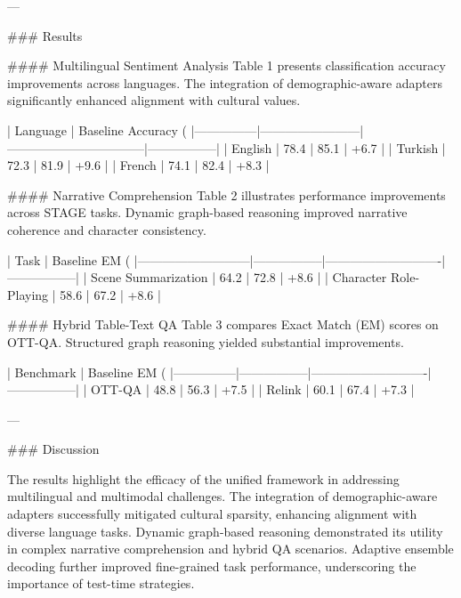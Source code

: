 ---

### Results

#### Multilingual Sentiment Analysis
Table 1 presents classification accuracy improvements across languages. The integration of demographic-aware adapters significantly enhanced alignment with cultural values.

| Language      | Baseline Accuracy (%
|---------------|------------------------|---------------------------------|-----------------|
| English       | 78.4                  | 85.1                           | +6.7            |
| Turkish       | 72.3                  | 81.9                           | +9.6            |
| French        | 74.1                  | 82.4                           | +8.3            |

#### Narrative Comprehension
Table 2 illustrates performance improvements across STAGE tasks. Dynamic graph-based reasoning improved narrative coherence and character consistency.

| Task                      | Baseline EM (%
|---------------------------|-----------------|----------------------------|-----------------|
| Scene Summarization       | 64.2            | 72.8                       | +8.6            |
| Character Role-Playing    | 58.6            | 67.2                       | +8.6            |

#### Hybrid Table-Text QA
Table 3 compares Exact Match (EM) scores on OTT-QA. Structured graph reasoning yielded substantial improvements.

| Benchmark     | Baseline EM (%
|---------------|-----------------|----------------------------|-----------------|
| OTT-QA        | 48.8            | 56.3                       | +7.5            |
| Relink        | 60.1            | 67.4                       | +7.3            |

---

### Discussion

The results highlight the efficacy of the unified framework in addressing multilingual and multimodal challenges. The integration of demographic-aware adapters successfully mitigated cultural sparsity, enhancing alignment with diverse language tasks. Dynamic graph-based reasoning demonstrated its utility in complex narrative comprehension and hybrid QA scenarios. Adaptive ensemble decoding further improved fine-grained task performance, underscoring the importance of test-time strategies.

